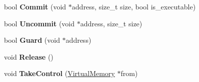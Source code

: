\begin{DoxyCompactItemize}
\item 
bool {\bfseries Commit} (void $\ast$address, size\+\_\+t size, bool is\+\_\+executable)\hypertarget{classv8_1_1base_1_1_virtual_memory_a3117a993344ce2ab6e0b1a3f9a64e869}{}\label{classv8_1_1base_1_1_virtual_memory_a3117a993344ce2ab6e0b1a3f9a64e869}

\item 
bool {\bfseries Uncommit} (void $\ast$address, size\+\_\+t size)\hypertarget{classv8_1_1base_1_1_virtual_memory_a91c8d8e0bb16a648bc88617dd5188907}{}\label{classv8_1_1base_1_1_virtual_memory_a91c8d8e0bb16a648bc88617dd5188907}

\item 
bool {\bfseries Guard} (void $\ast$address)\hypertarget{classv8_1_1base_1_1_virtual_memory_a8b1ab31dedd193da6be9108615e4f33a}{}\label{classv8_1_1base_1_1_virtual_memory_a8b1ab31dedd193da6be9108615e4f33a}

\item 
void {\bfseries Release} ()\hypertarget{classv8_1_1base_1_1_virtual_memory_a4c0a730fb2c4811af0f81ea5083196bc}{}\label{classv8_1_1base_1_1_virtual_memory_a4c0a730fb2c4811af0f81ea5083196bc}

\item 
void {\bfseries Take\+Control} (\hyperlink{classv8_1_1base_1_1_virtual_memory}{Virtual\+Memory} $\ast$from)\hypertarget{classv8_1_1base_1_1_virtual_memory_abd100ed8fc11612babfd30b7a539a696}{}\label{classv8_1_1base_1_1_virtual_memory_abd100ed8fc11612babfd30b7a539a696}

\end{DoxyCompactItemize}
